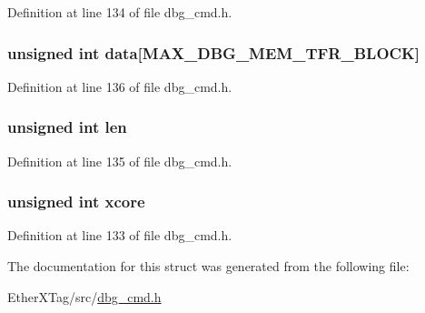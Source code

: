 Definition at line 134 of file dbg\-\_\-cmd.\-h.

\hypertarget{structdbg__cmd__type__write__mem_ab8207ec1023efdcd4c92b045fd4d2dd0}{
\subsubsection[{data}]{\setlength{\rightskip}{0pt plus 5cm}unsigned int data\mbox{[}{\bf M\-A\-X\-\_\-\-D\-B\-G\-\_\-\-M\-E\-M\-\_\-\-T\-F\-R\-\_\-\-B\-L\-O\-C\-K}\mbox{]}}}\label{structdbg__cmd__type__write__mem_ab8207ec1023efdcd4c92b045fd4d2dd0}


Definition at line 136 of file dbg\-\_\-cmd.\-h.

\hypertarget{structdbg__cmd__type__write__mem_a77124bd5f7e31e6fffc19f335da0c23f}{
\subsubsection[{len}]{\setlength{\rightskip}{0pt plus 5cm}unsigned int len}}\label{structdbg__cmd__type__write__mem_a77124bd5f7e31e6fffc19f335da0c23f}


Definition at line 135 of file dbg\-\_\-cmd.\-h.

\hypertarget{structdbg__cmd__type__write__mem_a78357326dd562d441c3c73f5676ac638}{
\subsubsection[{xcore}]{\setlength{\rightskip}{0pt plus 5cm}unsigned int xcore}}\label{structdbg__cmd__type__write__mem_a78357326dd562d441c3c73f5676ac638}


Definition at line 133 of file dbg\-\_\-cmd.\-h.



The documentation for this struct was generated from the following file\-:\begin{DoxyCompactItemize}
\item 
Ether\-X\-Tag/src/\hyperlink{dbg__cmd_8h}{dbg\-\_\-cmd.\-h}\end{DoxyCompactItemize}
